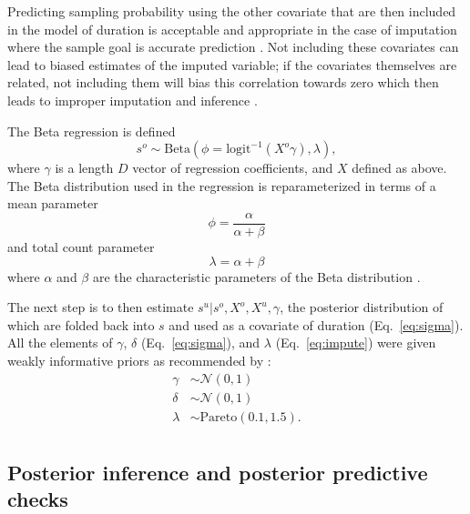 \documentclass[11pt]{article}
\begin{document}
Predicting sampling probability using the other covariate that are then included in the model of duration is acceptable and appropriate in the case of imputation where the sample goal is accurate prediction \citep{Rubin1996,Gelman2007}. Not including these covariates can lead to biased estimates of the imputed variable; if the covariates themselves are related, not including them will bias this correlation towards zero which then leads to improper imputation and inference \citep{Rubin1996}.

The Beta regression is defined
\begin{equation}
  s^{o} \sim \mathrm{Beta}(\phi = \text{logit}^{-1}(X^{o} \gamma), \lambda),
  \label{eq:impute}
\end{equation}
where \(\gamma\) is a length \(D\) vector of regression coefficients, and \(X\) defined as above. The Beta distribution used in the regression is reparameterized in terms of a mean parameter
\begin{equation}
  \phi = \frac{\alpha}{\alpha + \beta}
\end{equation}
and total count parameter
\begin{equation}
  \lambda = \alpha + \beta
\end{equation}
where \(\alpha\) and \(\beta\) are the characteristic parameters of the Beta distribution \citep{Gelman2013d}.

The next step is to then estimate \(s^{u} | s^{o}, X^{o}, X^{u}, \gamma\), the posterior distribution of which are folded back into \(s\) and used as a covariate of duration (Eq.~\ref{eq:sigma}). All the elements of \(\gamma\), \(\delta\) (Eq.~\ref{eq:sigma}), and \(\lambda\) (Eq.~\ref{eq:impute}) were given weakly informative priors as recommended by \citet{StanManual}:
\begin{equation}
  \begin{aligned}
    \gamma &\sim \mathcal{N}(0, 1) \\
    \delta &\sim \mathcal{N}(0, 1) \\
    \lambda &\sim \mathrm{Pareto}(0.1, 1.5). \\
  \end{aligned}
\end{equation}


\subsection*{Posterior inference and posterior predictive checks}
\end{document}
